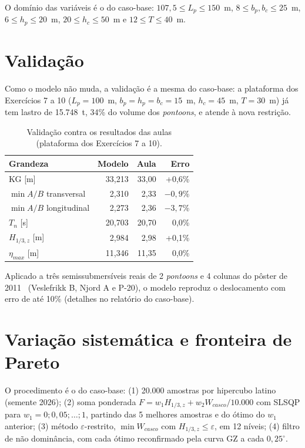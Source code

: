 \documentclass[11pt,a4paper]{article}
\newcommand{\Hz}{H_{1/3,z}}
\begin{document}
O domínio das variáveis é o do caso-base: $107{,}5 \le L_p \le 150$~m,
$8 \le b_p, b_c \le 25$~m, $6 \le h_p \le 20$~m, $20 \le h_c \le 50$~m e $12 \le T \le 40$~m.

\section{Validação}

Como o modelo não muda, a validação é a mesma do caso-base: a plataforma dos Exercícios 7 a 10
($L_p = 100$~m, $b_p = h_p = b_c = 15$~m, $h_c = 45$~m, $T = 30$~m) já tem lastro de 15.748~t,
34\% do volume dos \emph{pontoons}, e atende à nova restrição.

\begin{table}[H]
\centering
\caption{Validação contra os resultados das aulas (plataforma dos Exercícios 7 a 10).}\label{tab:valaula}
\begin{tabular}{lrrr}
\toprule
Grandeza & Modelo & Aula & Erro \\
\midrule
KG [m] & 33,213 & 33,00 & +0,6\% \\
$\min A/B$ transversal & 2,310 & 2,33 & $-0{,}9$\% \\
$\min A/B$ longitudinal & 2,273 & 2,36 & $-3{,}7$\% \\
$T_n$ [s] & 20,703 & 20,70 & 0,0\% \\
$\Hz$ [m] & 2,984 & 2,98 & +0,1\% \\
$\eta_{max}$ [m] & 11,346 & 11,35 & 0,0\% \\
\bottomrule
\end{tabular}
\end{table}

Aplicado a três semissubmersíveis reais de 2 \emph{pontoons} e 4 colunas do pôster de
2011~\cite{poster} (Veslefrikk B, Njord A e P-20), o modelo reproduz o deslocamento com erro de
até 10\% (detalhes no relatório do caso-base).

\section{Variação sistemática e fronteira de Pareto}\label{sec:otimizacao}

O procedimento é o do caso-base: (1) 20.000 amostras por hipercubo latino (semente 2026);
(2) soma ponderada $F = w_1\Hz + w_2 W_{casco}/10.000$ com SLSQP para $w_1 = 0; 0{,}05; \ldots; 1$,
partindo das 5 melhores amostras e do ótimo do $w_1$ anterior; (3) método $\varepsilon$-restrito,
$\min W_{casco}$ com $\Hz \le \varepsilon$, em 12 níveis; (4) filtro de não dominância, com cada
ótimo reconfirmado pela curva GZ a cada $0{,}25^\circ$.
\end{document}
